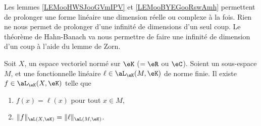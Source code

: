 	Les lemmes \ref{LEMooHWSJooGVmIPV} et \ref{LEMooBYEGooRswAmh} permettent de prolonger une forme linéaire une dimension réelle ou complexe à la fois. Rien ne nous permet de prolonger d'une infinité de dimensions d'un seul coup. Le théorème de Hahn-Banach va nous permettre de faire une infinité de dimension d'un coup à l'aide du lemme de Zorn.

	\begin{theorem}        \label{THOooTZSSooBKfxXE}
		Soit \( X\), un espace vectoriel normé sur \( \eK\) (\(=\eR\) ou \( \eC\)). Soient un sous-espace \( M\), et une fonctionnelle linéaire \( \ell\in\aL_{\eK}(M,\eK)\) de norme finie. Il existe \( f\in\aL_{\eK}(X,\eK)\) telle que
		\begin{enumerate}
			\item
			      \( f(x)=\ell(x)\) pour tout \( x\in M\),
			\item
			      \( \| f \|_{\aL(X,\eK)}=\| \ell \|_{\aL(M,\eK)}\).
		\end{enumerate}
	\end{theorem}

